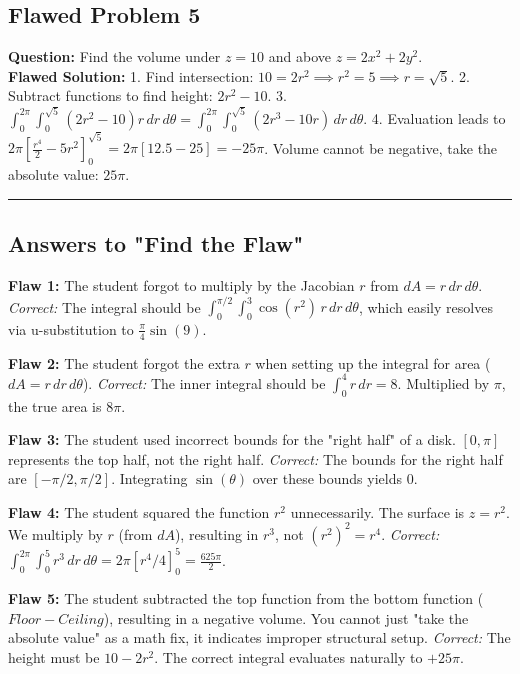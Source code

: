 \documentclass[12pt]{article}
\begin{document}
\subsection*{Flawed Problem 5}
\textbf{Question:} Find the volume under $z = 10$ and above $z = 2x^2+2y^2$. \\
\textbf{Flawed Solution:}
1. Find intersection: $10 = 2r^2 \implies r^2 = 5 \implies r = \sqrt{5}$. 
2. Subtract functions to find height: $2r^2 - 10$. 
3. $\int_0^{2\pi} \int_0^{\sqrt{5}} (2r^2 - 10)r \, dr \, d\theta = \int_0^{2\pi} \int_0^{\sqrt{5}} (2r^3 - 10r) \, dr \, d\theta$. 
4. Evaluation leads to $2\pi [ \frac{r^4}{2} - 5r^2 ]_0^{\sqrt{5}} = 2\pi [ 12.5 - 25 ] = -25\pi$. Volume cannot be negative, take the absolute value: $25\pi$.

\vspace{1cm}
\begin{center}
\rule{0.5\linewidth}{0.5pt}
\end{center}
\vspace{1cm}

\subsection*{Answers to "Find the Flaw"}
\textbf{Flaw 1:} The student forgot to multiply by the Jacobian $r$ from $dA = r \, dr \, d\theta$. 
\textit{Correct:} The integral should be $\int_0^{\pi/2} \int_0^3 \cos(r^2) \, r \, dr \, d\theta$, which easily resolves via u-substitution to $\frac{\pi}{4}\sin(9)$.

\textbf{Flaw 2:} The student forgot the extra $r$ when setting up the integral for area ($dA = r \, dr \, d\theta$). 
\textit{Correct:} The inner integral should be $\int_0^4 r \, dr = 8$. Multiplied by $\pi$, the true area is $8\pi$.

\textbf{Flaw 3:} The student used incorrect bounds for the "right half" of a disk. $[0, \pi]$ represents the top half, not the right half. 
\textit{Correct:} The bounds for the right half are $[-\pi/2, \pi/2]$. Integrating $\sin(\theta)$ over these bounds yields $0$.

\textbf{Flaw 4:} The student squared the function $r^2$ unnecessarily. The surface is $z = r^2$. We multiply by $r$ (from $dA$), resulting in $r^3$, not $(r^2)^2 = r^4$. 
\textit{Correct:} $\int_0^{2\pi} \int_0^5 r^3 \, dr \, d\theta = 2\pi [r^4/4]_0^5 = \frac{625\pi}{2}$.

\textbf{Flaw 5:} The student subtracted the top function from the bottom function ($Floor - Ceiling$), resulting in a negative volume. You cannot just "take the absolute value" as a math fix, it indicates improper structural setup. 
\textit{Correct:} The height must be $10 - 2r^2$. The correct integral evaluates naturally to $+25\pi$.
\end{document}
